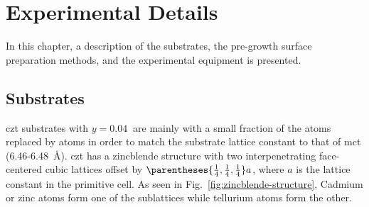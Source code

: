 
\chapter{Experimental Details}\label{ch:exp-details}
In this chapter, a description of the substrates, the pre-growth surface preparation methods, and the experimental equipment is presented.
\section[\ce{Cd_{1-y}Zn_yTe} Substrates]{ Substrates%
       }

\Acl{czt} substrates with $y=\SI{0.04}{}$ are mainly  with a small fraction of the  atoms replaced by  atoms in order to match the substrate lattice constant to that of \acl{mct} (\SI{6.46}{}-\SI{6.48}{\angstrom}). \Ac{czt} has a zincblende structure with two interpenetrating face-centered cubic lattices offset by $\parentheses{\frac{1}{4},\frac{1}{4},\frac{1}{4}}a$, where $a$ is the lattice constant in the primitive cell. As seen in Fig.~\ref{fig:zincblende-structure}, Cadmium or zinc atoms form one of the sublattices while tellurium atoms form the other.

